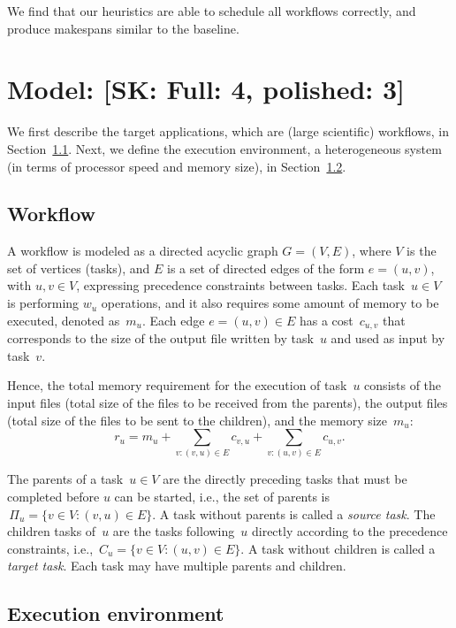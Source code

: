 \documentclass[conference]{IEEEtran}
\newcommand{\parents}[1]{\,\Pi_{#1}}
\newcommand{\children}[1]{\,C_{#1}}
\newcommand{\skug}[1]{{\color{blue}[SK: #1]}}
\begin{document}
    We find that our heuristics are able to schedule all workflows correctly, and produce makespans similar to the baseline.


    \section{Model: \skug{Full: 4, polished: 3}}

    We first describe the target applications, which are (large scientific) workflows,
    in Section~\ref{sec.mod.work}.  Next, we define the execution
    environment, a heterogeneous system (in terms of processor speed and memory size),
    in Section~\ref{sec.mod.plat}.

    \subsection{Workflow}
    \label{sec.mod.work}
    A workflow is modeled as a directed acyclic graph $G=(V, E)$, where $V$ is the set of vertices (tasks), and
    $E$ is a set of directed edges of the form $e=(u,v)$, with $u,v\in V$, expressing precedence constraints between tasks.
    Each task~$u \in V$  is performing $w_u$ operations, and it also
    requires some amount of memory to be executed, denoted as~$m_u$.
    Each edge $e=(u,v) \in E$ has a cost~$c_{u,v}$ that corresponds to the size of the output file written by task~$u$ and used as input by task~$v$.

    Hence, the total  memory requirement for the execution of task~$u$ consists of the input files
    (total size of the files to be received from the parents),
    the output files (total size of the files to be sent to the children),
    and the memory size~$m_u$:
    \[
        r_u = m_u + \sum_{v:(v,u)\in E}c_{v,u} + \sum_{v:(u,v)\in E} c_{u,v}.
    \]

    The parents of a task~$u\in V$ are the directly preceding tasks that must be completed before $u$ can be started, i.e., the set of parents is
    $ \parents{u} = \{v \in V: (v,u) \in E\}$. A task without parents is called a {\it source task}.
    The children tasks of~$u$ are the tasks following~$u$ directly according to the precedence constraints, i.e.,
    $ \children{u} = \{v \in V: (u,v) \in E\}$. A task without children is called a {\it target task}.
    Each task may have multiple parents and children.

    \subsection{Execution environment}
    \label{sec.mod.plat}
\end{document}
